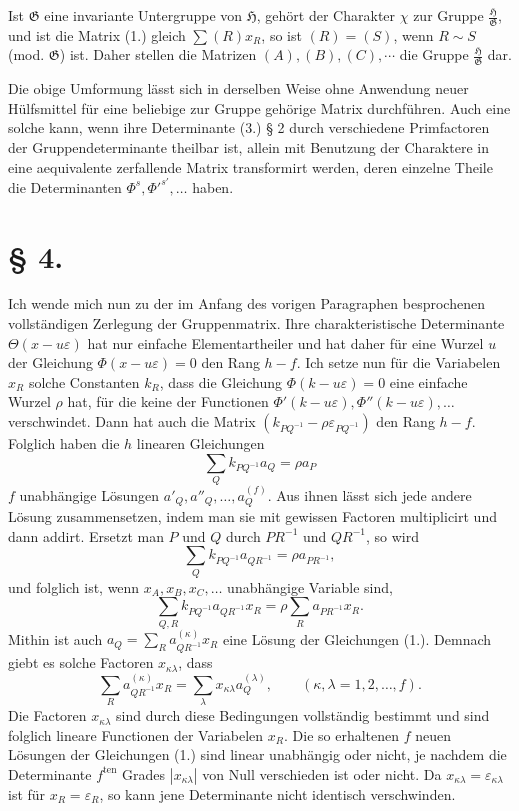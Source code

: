 \documentclass[11pt]{article}
\newcommand{\Hgrp}{\mathfrak{H}}
\newcommand{\Ggrp}{\mathfrak{G}}
\newcommand{\eps}{\varepsilon}
\newcommand{\ten}{\mathrm{ten}}
\begin{document}
Ist $\Ggrp$ eine invariante Untergruppe von $\Hgrp$, gehört der Charakter $\chi$ zur Gruppe $\frac{\Hgrp}{\Ggrp}$, und ist die Matrix (1.) gleich $\sum(R)x_R$, so ist $(R)=(S)$, wenn $R\sim S$ (mod. $\Ggrp$) ist. Daher stellen die Matrizen $(A),(B),(C),\cdots$ die Gruppe $\frac{\Hgrp}{\Ggrp}$ dar.

Die obige Umformung lässt sich in derselben Weise ohne Anwendung neuer Hülfsmittel für eine beliebige zur Gruppe gehörige Matrix durchführen. Auch eine solche kann, wenn ihre Determinante (3.) § 2 durch verschiedene Primfactoren der Gruppendeterminante theilbar ist, allein mit Benutzung der Charaktere in eine aequivalente zerfallende Matrix transformirt werden, deren einzelne Theile die Determinanten $\Phi^s,{\Phi'}^{s'},\ldots$ haben.

\section*{§ 4.}

Ich wende mich nun zu der im Anfang des vorigen Paragraphen besprochenen vollständigen Zerlegung der Gruppenmatrix. Ihre charakteristische Determinante $\Theta(x-u\eps)$ hat nur einfache Elementartheiler und hat daher für eine Wurzel $u$ der Gleichung $\Phi(x-u\eps)=0$ den Rang $h-f$. Ich setze nun für die Variabelen $x_R$ solche Constanten $k_R$, dass die Gleichung $\Phi(k-u\eps)=0$ eine einfache Wurzel $\rho$ hat, für die keine der Functionen $\Phi'(k-u\eps),\Phi''(k-u\eps),\ldots$ verschwindet. Dann hat auch die Matrix $(k_{PQ^{-1}}-\rho\eps_{PQ^{-1}})$ den Rang $h-f$. Folglich haben die $h$ linearen Gleichungen
\begin{equation}\tag{1.}
\sum_Q k_{PQ^{-1}}a_Q=\rho a_P
\end{equation}
$f$ unabhängige Lösungen $a'_Q,a''_Q,\ldots,a^{(f)}_Q$. Aus ihnen lässt sich jede andere Lösung zusammensetzen, indem man sie mit gewissen Factoren multiplicirt und dann addirt. Ersetzt man $P$ und $Q$ durch $PR^{-1}$ und $QR^{-1}$, so wird
\[
\sum_Q k_{PQ^{-1}}a_{QR^{-1}}=\rho a_{PR^{-1}},
\]
und folglich ist, wenn $x_A,x_B,x_C,\ldots$ unabhängige Variable sind,
\[
\sum_{Q,R} k_{PQ^{-1}}a_{QR^{-1}}x_R=\rho\sum_R a_{PR^{-1}}x_R.
\]
Mithin ist auch $a_Q=\sum_R a^{(\kappa)}_{QR^{-1}}x_R$ eine Lösung der Gleichungen (1.). Demnach giebt es solche Factoren $x_{\kappa\lambda}$, dass
\begin{equation}\tag{2.}
\sum_R a^{(\kappa)}_{QR^{-1}}x_R=\sum_\lambda x_{\kappa\lambda}a^{(\lambda)}_Q,\qquad(\kappa,\lambda=1,2,\ldots,f).
\end{equation}
Die Factoren $x_{\kappa\lambda}$ sind durch diese Bedingungen vollständig bestimmt und sind folglich lineare Functionen der Variabelen $x_R$. Die so erhaltenen $f$ neuen Lösungen der Gleichungen (1.) sind linear unabhängig oder nicht, je nachdem die Determinante $f^{\ten}$ Grades $|x_{\kappa\lambda}|$ von Null verschieden ist oder nicht. Da $x_{\kappa\lambda}=\eps_{\kappa\lambda}$ ist für $x_R=\eps_R$, so kann jene Determinante nicht identisch verschwinden.
\end{document}
